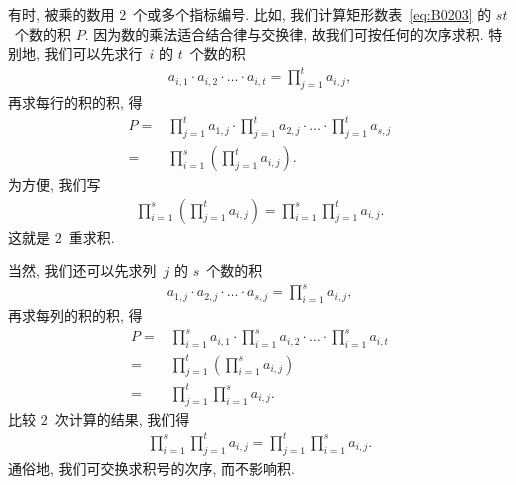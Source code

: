 \documentclass[../libro.tex]{subfiles}
\begin{document}
有时, 被乘的数用 \(2\)~个或多个指标编号.
比如, 我们计算矩形数表~\eqref{eq:B0203} 的 \(st\)~个数的积 \(P\).
因为数的乘法适合结合律与交换律,
故我们可按任何的次序求积.
特别地, 我们可以先求行~\(i\) 的 \(t\)~个数的积
\begin{align*}
    a_{i,1} \cdot a_{i,2} \cdot \dots \cdot a_{i,t}
    = \prod_{j = 1}^{t} {a_{i,j}},
\end{align*}
再求每行的积的积, 得
\begin{align*}
    P
    = {} &
    \prod_{j = 1}^{t} {a_{1,j}}
    \cdot \prod_{j = 1}^{t} {a_{2,j}}
    \cdot \dots
    \cdot \prod_{j = 1}^{t} {a_{s,j}}
    \\
    = {} &
    \prod_{i = 1}^{s}
    {\left( \prod_{j = 1}^{t} {a_{i,j}} \right)}.
\end{align*}
为方便, 我们写
\begin{align*}
    \prod_{i = 1}^{s}
    {\left( \prod_{j = 1}^{t} {a_{i,j}} \right)}
    = \prod_{i = 1}^{s}
    {\prod_{j = 1}^{t} {a_{i,j}}}.
\end{align*}
这就是 \(2\)~重求积.

当然, 我们还可以先求列~\(j\) 的 \(s\)~个数的积
\begin{align*}
    a_{1,j} \cdot a_{2,j} \cdot \dots \cdot a_{s,j}
    = \prod_{i = 1}^{s} {a_{i,j}},
\end{align*}
再求每列的积的积, 得
\begin{align*}
    P
    = {} &
    \prod_{i = 1}^{s} {a_{i,1}}
    \cdot \prod_{i = 1}^{s} {a_{i,2}}
    \cdot \dots
    \cdot \prod_{i = 1}^{s} {a_{i,t}}
    \\
    = {} &
    \prod_{j = 1}^{t}
    {\left( \prod_{i = 1}^{s} {a_{i,j}} \right)}
    \\
    = {} &
    \prod_{j = 1}^{t}
    {\prod_{i = 1}^{s} {a_{i,j}}}.
\end{align*}
比较 \(2\)~次计算的结果, 我们得
\begin{align*}
    \prod_{i = 1}^{s} {\prod_{j = 1}^{t} {a_{i,j}}}
    = \prod_{j = 1}^{t} {\prod_{i = 1}^{s} {a_{i,j}}}.
\end{align*}
通俗地, 我们可交换求积号的次序, 而不影响积.
\end{document}

